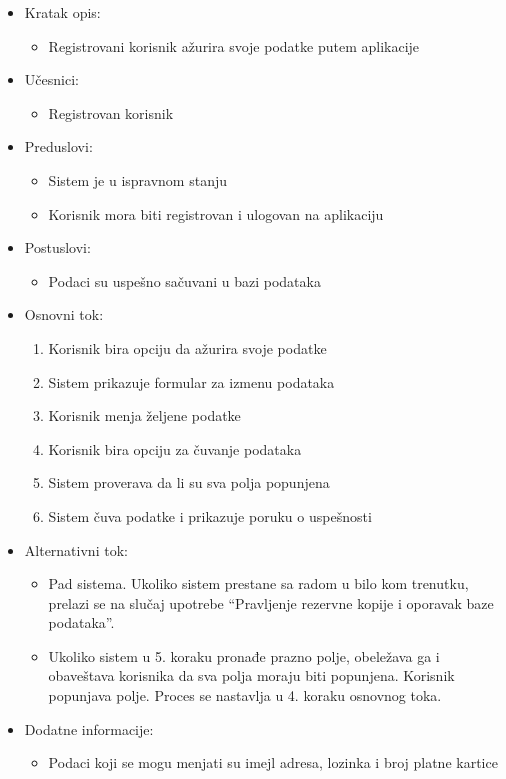 \begin{itemize}
    \item Kratak opis:
        \begin{itemize}
            \item Registrovani korisnik ažurira svoje podatke putem aplikacije
        \end{itemize}
    \item Učesnici:
        \begin{itemize}
            \item Registrovan korisnik
        \end{itemize}
    \item Preduslovi:
        \begin{itemize}
            \item Sistem je u ispravnom stanju
            \item Korisnik mora biti registrovan i ulogovan na aplikaciju
        \end{itemize}
    \item Postuslovi:
        \begin{itemize}
            \item Podaci su uspešno sačuvani u bazi podataka
        \end{itemize}
    \item Osnovni tok:
        \begin{enumerate}
            \item Korisnik bira opciju da ažurira svoje podatke
            \item Sistem prikazuje formular za izmenu podataka
            \item Korisnik menja željene podatke 
            \item Korisnik bira opciju za čuvanje podataka
            \item Sistem proverava da li su sva polja popunjena
            \item Sistem čuva podatke i prikazuje poruku o uspešnosti
        \end{enumerate}
    \item Alternativni tok:
        \begin{itemize}
            \item Pad sistema. Ukoliko sistem prestane sa radom u bilo kom trenutku, prelazi se na slučaj upotrebe ``Pravljenje rezervne kopije i oporavak baze podataka''.
            \item Ukoliko sistem u 5. koraku pronađe prazno polje, obeležava ga i obaveštava korisnika da sva polja moraju biti popunjena. Korisnik popunjava polje. Proces se nastavlja u 4. koraku osnovnog toka.
        \end{itemize}
    \item Dodatne informacije:
        \begin{itemize}
            \item Podaci koji se mogu menjati su imejl adresa, lozinka i broj platne kartice
        \end{itemize}
\end{itemize}

